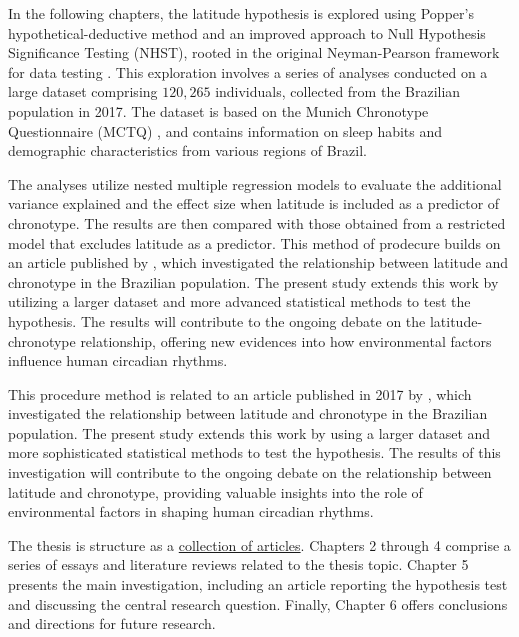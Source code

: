 \documentclass[
12pt,
openright,
oneside,
a4paper,
chapter=TITLE,
section=TITLE,
french,
spanish,
brazil,
english
]{abntex2}\usepackage{array}
\begin{document}
In the following chapters, the latitude hypothesis is explored using
Popper's hypothetical-deductive method \autocite{popper1979} and an
improved approach to Null Hypothesis Significance Testing (NHST), rooted
in the original Neyman-Pearson framework for data testing
\autocite{neyman1928,neyman1928a,perezgonzalez2015}. This exploration
involves a series of analyses conducted on a large dataset comprising
\(120,265\) individuals, collected from the Brazilian population in
2017. The dataset is based on the Munich Chronotype Questionnaire (MCTQ)
\autocite{roenneberg2003,roenneberg2012a}, and contains information on
sleep habits and demographic characteristics from various regions of
Brazil.

The analyses utilize nested multiple regression models to evaluate the
additional variance explained and the effect size when latitude is
included as a predictor of chronotype. The results are then compared
with those obtained from a restricted model that excludes latitude as a
predictor. This method of prodecure builds on an article published by
\textcite{leocadio-miguel2017}, which investigated the relationship
between latitude and chronotype in the Brazilian population. The present
study extends this work by utilizing a larger dataset and more advanced
statistical methods to test the hypothesis. The results will contribute
to the ongoing debate on the latitude-chronotype relationship, offering
new evidences into how environmental factors influence human circadian
rhythms.

This procedure method is related to an article published in 2017 by
\textcite{leocadio-miguel2017}, which investigated the relationship
between latitude and chronotype in the Brazilian population. The present
study extends this work by using a larger dataset and more sophisticated
statistical methods to test the hypothesis. The results of this
investigation will contribute to the ongoing debate on the relationship
between latitude and chronotype, providing valuable insights into the
role of environmental factors in shaping human circadian rhythms.

The thesis is structure as a
\href{https://en.wikipedia.org/wiki/Collection_of_articles}{collection
of articles}. Chapters 2 through 4 comprise a series of essays and
literature reviews related to the thesis topic. Chapter 5 presents the
main investigation, including an article reporting the hypothesis test
and discussing the central research question. Finally, Chapter 6 offers
conclusions and directions for future research.
\end{document}
